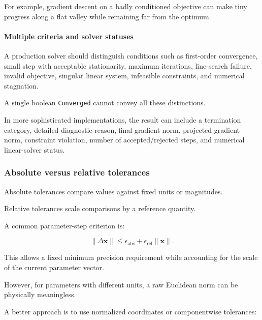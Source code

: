 For example, gradient descent on a badly conditioned objective can make tiny progress along a flat valley while remaining far from the optimum.

\paragraph{Multiple criteria and solver statuses}\label{02-foundations-ii-ch027-multiple-criteria-and-solver-statuses}

\hypertarget{02-foundations-ii-ch027-multiple-criteria-and-solver-statuses}{}

A production solver should distinguish conditions such as first-order convergence, small step with acceptable stationarity, maximum iterations, line-search failure, invalid objective, singular linear system, infeasible constraints, and numerical stagnation.

A single boolean \texttt{Converged} cannot convey all these distinctions.

In more sophisticated implementations, the result can include a termination category, detailed diagnostic reason, final gradient norm, projected-gradient norm, constraint violation, number of accepted/rejected steps, and numerical linear-solver status.

\subsubsection{Absolute versus relative tolerances}\label{02-foundations-ii-ch027-absolute-versus-relative-tolerances}

\hypertarget{02-foundations-ii-ch027-absolute-versus-relative-tolerances}{}

Absolute tolerances compare values against fixed units or magnitudes.

Relative tolerances scale comparisons by a reference quantity.

A common parameter-step criterion is:

\[
\boxed{ \|\Delta\mathbf x\| \le \epsilon_{\mathrm{abs}}+ \epsilon_{\mathrm{rel}}\|\mathbf x\| }.
\]

This allows a fixed minimum precision requirement while accounting for the scale of the current parameter vector.

However, for parameters with different units, a raw Euclidean norm can be physically meaningless.

A better approach is to use normalized coordinates or componentwise tolerances:

